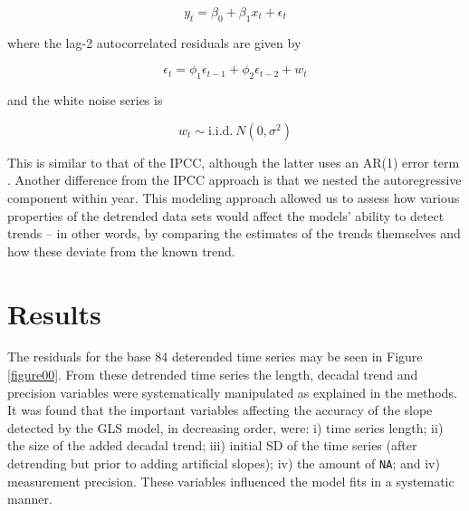 \documentclass[]{ametsoc}
\begin{document}
$$y_{t} = \beta_{0} + \beta_{1}x_{t} + \epsilon_{t}$$

where the lag-2 autocorrelated residuals are given by

$$\epsilon_{t} = \phi_{1}\epsilon_{t-1} + \phi_{2}\epsilon_{t-2} + w_{t}$$

and the white noise series is

$$w_{t} \sim \mathrm{i.i.d.}~N(0,\sigma^{2})$$

This is similar to that of the IPCC, although the latter uses an AR(1) error term \citep{IPCC2013supp}. Another difference from the IPCC approach is that we nested the autoregressive component within year. This modeling approach allowed us to assess how various properties of the detrended data sets would affect the models' ability to detect trends -- in other words, by comparing the estimates of the trends themselves and how these deviate from the known trend.

\section{Results}
The residuals for the base 84 deterended time series may be seen in Figure \ref{figure00}. From these detrended time series the length, decadal trend and precision variables were systematically manipulated as explained in the methods. It was found that the important variables affecting the accuracy of the slope detected by the GLS model, in decreasing order, were: i) time series length; ii) the size of the added decadal trend; iii) initial SD of the time series (after detrending but prior to adding artificial slopes); iv) the amount of \texttt{NA}; and iv) measurement precision. These variables influenced the model fits in a systematic manner.
\end{document}

